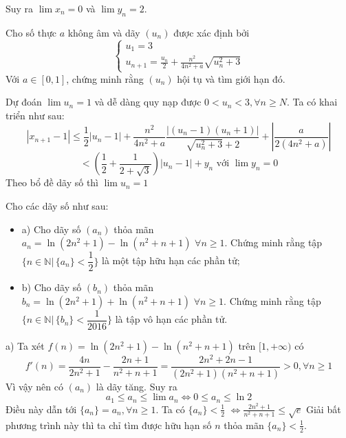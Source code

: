 \documentclass[11pt]{scrartcl}
\begin{document}
\begin{itemize}[label=, leftmargin=0em, itemsep=0.5em]
\begin{sol}
        Suy ra $\lim x_n = 0$ và $\lim y_n = 2$.
    \end{sol}
    
    \begin{bt}
        Cho số thực $a$ không âm và dãy $(u_n)$ được xác định bởi\[ \begin{cases} u_1=3\\ u_{n+1}=\frac{u_n}{2}+\frac{n^2}{4n^2+a}\sqrt{u_n^2+3} \end{cases} \]
    Với $a\in [0,1]$, chứng minh rằng $(u_n)$ hội tụ và tìm giới hạn đó.
    \end{bt}

    \begin{sol}
        Dự đoán $\lim u_n = 1$ và dễ dàng quy nạp được $0 < u_n < 3, \forall n\geq N$. Ta có khai triển như sau:
        \[|x_{n+1} - 1| \leq \frac{1}{2}|u_n - 1| + \frac{n^2}{4n^2 + a}\frac{|(u_n - 1)(u_n + 1)|}{\sqrt{u_n^2 + 3} + 2} + |\frac{a}{2(4n^2 + a)}|\]\[ < \left(\frac{1}{2} + \frac{1}{2 + \sqrt{3}}\right)|u_n - 1| + y_n \text{ với } \lim y_n = 0\]
        Theo bổ đề dãy số thì $\lim u_n = 1$
    \end{sol}
    \begin{bt}Cho các dãy số như sau:
        \begin{itemize}[label=]
            \item a) Cho dãy số $(a_n)$ thỏa mãn  $a_n=\ln (2n^2+1)-\ln (n^2+n+1)\,\,\forall n\geq 1.$ Chứng minh rằng tập $\{n\in\mathbb{N}|\,\{a_n\}<\dfrac{1}{2}\}$ là một tập hữu hạn các phần tử;
            \item b) Cho dãy số $(b_n)$ thỏa mãn $b_n=\ln (2n^2+1)+\ln (n^2+n+1)\,\,\forall n\geq 1$. Chứng minh rằng tập $\{n\in\mathbb{N}|\,\{b_n\}<\dfrac{1}{2016}\}$ là tập vô hạn các phần tử.
        \end{itemize}
    \end{bt}

    \begin{sol}
        a) Ta xét  $f(n) = \ln(2n^2 + 1) - \ln(n^2 + n + 1)$ trên $[1,+\infty)$ có $$f'(n) = \frac{4n}{2n^2 + 1} - \frac{2n + 1}{n^2 + n + 1}  = \frac{2n^2 + 2n - 1}{(2n^2 + 1)(n^2 + n + 1)} > 0, \forall n \geq 1$$
        Vì vậy nên có $(a_n)$ là dãy tăng. Suy ra
        $$
        a_1 \leq a_n \leq \lim a_n \Leftrightarrow 0 \leq a_n \leq \ln 2 
        $$
        Điều này dẫn tới $\{a_n\} = a_n, \forall n \geq 1$. Ta có $\{a_n\} < \frac{1}{2}$
        $
        \Leftrightarrow \frac{2n^2 + 1}{n^2 + n + 1} \leq \sqrt{e}
        $
        Giải bất phương trình này thì ta chỉ tìm được hữu hạn số $n$ thỏa mãn $\{a_n\} < \frac{1}{2}$.



\end{sol}
\end{itemize}
\end{document}
